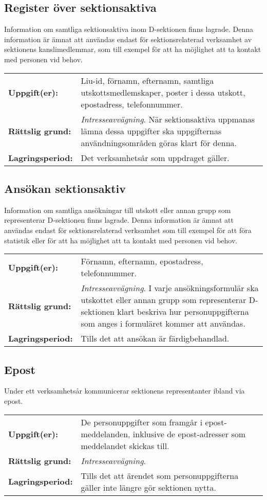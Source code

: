 \documentclass{datateknologsektionen-document}
\begin{document}
\subsection{Register över sektionsaktiva}
Information om samtliga sektionsaktiva inom D-sektionen finns lagrade.
Denna information är ämnat att användas endast för sektionsrelaterad verksamhet av sektionens kanslimedlemmar, som till exempel för att ha möjlighet att ta kontakt med personen vid behov.

\begin{longtabu}{l X}
  \textbf{Uppgift(er):}    & Liu-id, förnamn, efternamn, samtliga utskottsmedlemskaper, poster i dessa utskott, epostadress, telefonnummer. \\
  \textbf{Rättslig grund:} & \textit{Intresseavvägning}. När sektionsaktiva uppmanas lämna dessa uppgifter ska uppgifternas användningsområden göras klart för denna. \\
  \textbf{Lagringsperiod:} & Det verksamhetsår som uppdraget gäller.
\end{longtabu}

\subsection{Ansökan sektionsaktiv}
Information om samtliga ansökningar till utskott eller annan grupp som representerar D-sektionen finns lagrade.
Denna information är ämnat att användas endast för sektionsrelaterad verksamhet som till exempel för att föra statistik eller för att ha möjlighet att ta kontakt med personen vid behov.

\begin{longtabu}{l X}
  \textbf{Uppgift(er):}    & Förnamn, efternamn, epostadress, telefonnummer. \\
  \textbf{Rättslig grund:} & \textit{Intresseavvägning}. I varje ansökningsformulär ska utskottet eller annan grupp som representerar D-sektionen klart beskriva hur personuppgifterna som anges i formuläret kommer att användas. \\
  \textbf{Lagringsperiod:} & Tills det att ansökan är färdigbehandlad.
\end{longtabu}

\subsection{Epost}
Under ett verksamhetsår kommunicerar sektionens representanter ibland via epost.

\begin{longtabu}{l X}
  \textbf{Uppgift(er):}    & De personuppgifter som framgår i epost-meddelanden, inklusive de epost-adresser som meddelandet skickas till.                                                                                                                                    \\
  \textbf{Rättslig grund:} & \textit{Intresseavvägning}. \\
  \textbf{Lagringsperiod:} & Tills det att ärendet som personuppgifterna gäller inte längre gör sektionen nytta.
\end{longtabu}
\end{document}

